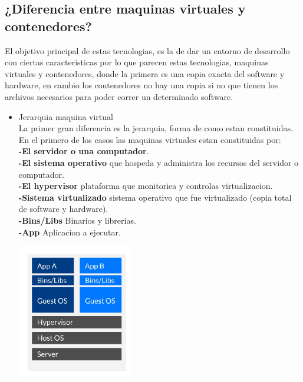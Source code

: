 \documentclass[twoside,twocolumn]{article}
\begin{document}
\subsection{¿Diferencia entre maquinas virtuales y contenedores?}
El objetivo principal de estas tecnologias, es la de dar un entorno de desarrollo con ciertas caracteristicas por lo que parecen estas tecnologias, maquinas virtuales y contenedores, donde la primera es una copia exacta del software y hardware, en cambio los contenedores no hay una copia si no que tienen los archivos necesarios para poder correr un determinado software.

\begin{itemize}
	\item Jerarquia maquina virtual
	\\La primer gran diferencia es la jerarquia, forma de como estan constituidas. En el primero de los casos las maquinas virtuales estan constituidas por:
	\\ \textbf{-El servidor o una computador}.
	\\ \textbf{-El sistema operativo} que hospeda y administra los recursos del servidor o computador.
	\\ \textbf{-El hypervisor} plataforma que monitoriea y controlas virtualizacion.
	\\ \textbf{-Sistema virtualizado} sistema operativo que fue virtualizado (copia total de software y hardware).
	\\ \textbf{-Bins/Libs} Binarios y librerias.
	\\ \textbf{-App} Aplicacion a ejecutar.
	\begin{center}
	\includegraphics[width=5cm]{./Imagenes/jerarquia1} 
	\end{center}
\end{itemize} 
\end{document}
